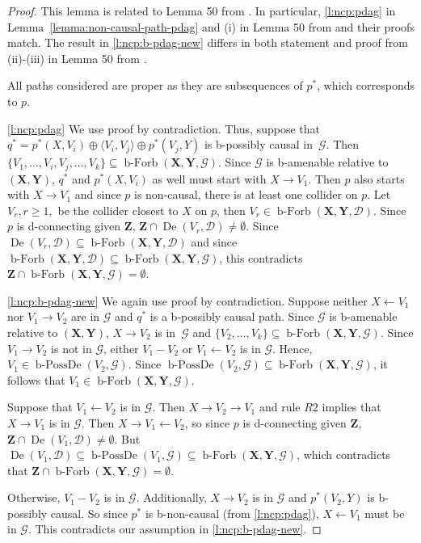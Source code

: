 \documentclass[letterpaper]{article}
\theoremstyle{definition}
\theoremstyle{remark}
\DeclareMathOperator{\bPossDe}{b-PossDe}
\DeclareMathOperator{\De}{De}
\DeclareMathOperator{\bForbb}{b-Forb}
\newcommand{\g}[1][G]{\mathcal{#1}}
\newcommand{\bfb}[2][X,Y]{\bForbb(\mathbf{#1},#2)}
\newcommand{\pstar}[1][p]{{#1}^{*}}
\begin{document}
\begin{proof}
This lemma is related to Lemma 50 from \cite{perkovic16}. In particular, \ref{l:ncp:pdag} in Lemma~\ref{lemma:non-causal-path-pdag} and (i) in Lemma 50 from \cite{perkovic16} and their proofs match. The result in \ref{l:ncp:b-pdag-new} differs in both statement and proof from (ii)-(iii) in Lemma 50 from \cite{perkovic16}.

All paths considered are proper as they are subsequences of $\pstar$, which corresponds to $p$.

\ref{l:ncp:pdag} We use proof by contradiction. Thus, suppose that $\pstar[q] = \pstar(X,V_i) \oplus \langle V_i, V_j \rangle \oplus \pstar(V_j,Y) $ is b-possibly causal in~$\g$. Then  $\{V_1,\dots,V_i,V_j,\dots,V_k\} \subseteq \bfb{\g}$. Since $\g$ is b-amenable relative to $(\mathbf{X,Y})$, $\pstar[q]$ and $\pstar(X,V_i)$ as well must start with $X \rightarrow V_1$.
Then $p$ also starts with $X \rightarrow V_1$ and since $p$ is non-causal, there is at least one collider on $p$.
Let $V_r, r \ge 1,$ be the collider closest to $X$ on $p$, then $V_r \in \bfb{\g[D]}$. Since $p$ is d-connecting given $\mathbf{Z}$, $\mathbf{Z} \cap \De(V_r,\g[D]) \neq \emptyset$. Since $\De(V_r,\g[D]) \subseteq \bfb{\g[D]}$ and since $\bfb{\g[D]} \subseteq \bfb{\g}$, this contradicts $\mathbf{Z} \cap \bfb{\g} = \emptyset$.

\ref{l:ncp:b-pdag-new} We again use proof by contradiction. Suppose neither $X \leftarrow V_1$ nor $V_1 \rightarrow V_2$ are in $\g$ and $\pstar[q]$ is a b-possibly causal path. Since $\g$ is b-amenable relative to $(\mathbf{X,Y})$, $X \to V_2$ is in~$\g$ and  $\{V_2,\dots,V_k\} \subseteq \bfb{\g}$.
Since $V_1 \rightarrow V_2$ is not in $\g$, either $V_1 - V_2$ or $V_1\leftarrow V_2$ is in $\g$. Hence, $V_1 \in \bPossDe(V_2,\g)$. Since $\bPossDe(V_2,\g) \subseteq \bfb{\g}$, it follows that $V_1 \in \bfb{\g}$.

Suppose that $V_1 \leftarrow V_2$ is in $\g$. Then $X \rightarrow V_2 \rightarrow V_1$ and rule $R2$ implies that $X \rightarrow V_1$ is in $\g$.
 Then $X \rightarrow V_1 \leftarrow V_2$, so since $p$ is d-connecting given $\mathbf{Z}$, $\mathbf{Z} \cap \De(V_1,\g[D]) \neq \emptyset$. But $\De(V_1,\g[D]) \subseteq \bPossDe(V_1,\g) \subseteq \bfb{\g}$, which contradicts that $\mathbf{Z} \cap \bfb{\g} = \emptyset$.

Otherwise, $V_1 -V_2$ is in $\g$. Additionally, $X \rightarrow V_2$ is in $\g$ and $\pstar(V_2,Y)$ is b-possibly causal. So since $\pstar$ is b-non-causal (from \ref{l:ncp:pdag}), $X \leftarrow V_1$ must be in $\g$. This contradicts our assumption in \ref{l:ncp:b-pdag-new}. 
\end{proof}
\end{document}

